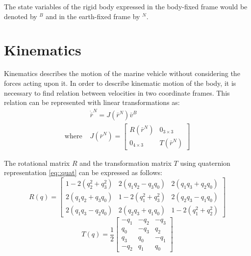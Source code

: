     The state variables of the rigid body expressed in the body-fixed frame would be 
    denoted by $^B$ and in the earth-fixed frame by $^N$.

\section{Kinematics}

    Kinematics describes the motion of the marine vehicle without considering the forces acting upon it.
    In order to describe kinematic motion of the body, it is necessary to find relation between velocities in two coordinate frames.
    This relation can be represented with linear transformations as:
    \begin{equation}
    \begin{aligned}
        & \dot{\bar{r}}^N=J(\bar{r}^N) \bar{v}^B \\
        \text{where } & J(\bar{r}^N)=\left[\begin{array}{cc}
        R(\bar{r}^N) & 0_{3 \times 3} \\
        0_{4 \times 3} & T(\bar{r}^N)
        \end{array}\right]
    \end{aligned}
    \label{eq::kinematics}
    \end{equation}
    
    The rotational matrix $R$ and the transformation matrix $T$ using quaternion representation \ref{eq::quat} can be expressed as follows:
    \begin{equation}
    R(q)=\left[\begin{array}{ccc}
        1-2\left(q_2^2+q_3^2\right) & 2\left(q_1 q_2-q_3 q_0\right) & 2\left(q_1 q_3+q_2 q_0\right) \\
        2\left(q_1 q_2+q_3 q_0\right) & 1-2\left(q_1^2+q_3^2\right) & 2\left(q_2 q_3-q_1 q_0\right) \\
        2\left(q_1 q_3-q_2 q_0\right) & 2\left(q_2 q_3+q_1 q_0\right) & 1-2\left(q_1^2+q_2^2\right)
        \end{array}\right]
    \end{equation}
    \begin{equation}
    T(q)=\frac{1}{2}\left[\begin{array}{rrr}
        -q_1 & -q_2 & -q_3 \\
        q_0 & -q_3 & q_2 \\
        q_3 & q_0 & -q_1 \\
        -q_2 & q_1 & q_0
        \end{array}\right]
    \end{equation}


